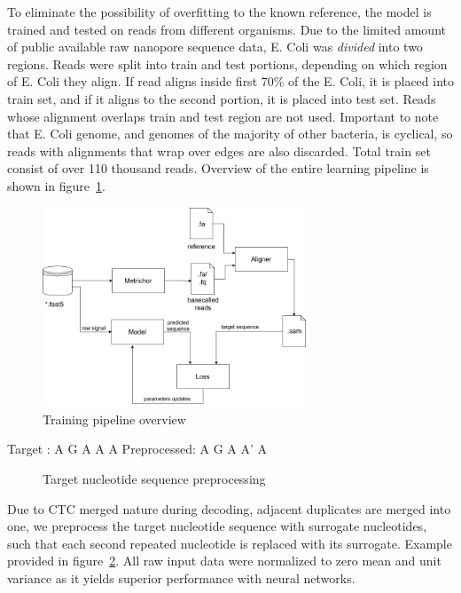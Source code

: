 \documentclass[runningheads,a4paper]{llncs}
\begin{document}
To eliminate the possibility of overfitting to the known reference, the model is trained and tested on reads from different organisms. Due to the limited amount of public available raw nanopore sequence data, E. Coli was \emph{divided} into two regions.
Reads were split into train and test portions, depending on which region of E. Coli they align.
If read aligns inside first 70\% of the E. Coli, it is placed into train set, and if it aligns to the second portion, it is placed into test set. Reads whose alignment overlaps train and test region are not used. Important to note that E. Coli genome, and genomes of the majority of other bacteria, is cyclical, so reads with alignments that wrap over edges are also discarded. Total train set consist of over 110 thousand reads.
Overview of the entire learning pipeline is shown in figure~\ref{fg:train_pipe}.

\begin{figure}[!ht]
	\begin{center}
		\includegraphics[width=0.7\textwidth]{./imgs/train_pipeline.png}
		\caption{Training pipeline overview}
		\label{fg:train_pipe}
	\end{center}
\end{figure}

\begin{verbbox}
    Target      :  A  G  A  A  A
    Preprocessed:  A  G  A  A' A
\end{verbbox}

\begin{figure}[!h]
    \centering
    \theverbbox
    \caption{Target nucleotide sequence preprocessing}
    \label{fig:data_preprocessing}
\end{figure}

Due to CTC merged nature during decoding, adjacent duplicates are merged into one, we preprocess the target nucleotide sequence with surrogate nucleotides, such that each second repeated nucleotide is replaced with its surrogate. Example provided in figure~\ref{fig:data_preprocessing}. All raw input data were normalized to zero mean and unit variance as it yields superior performance with neural networks.
\end{document}
